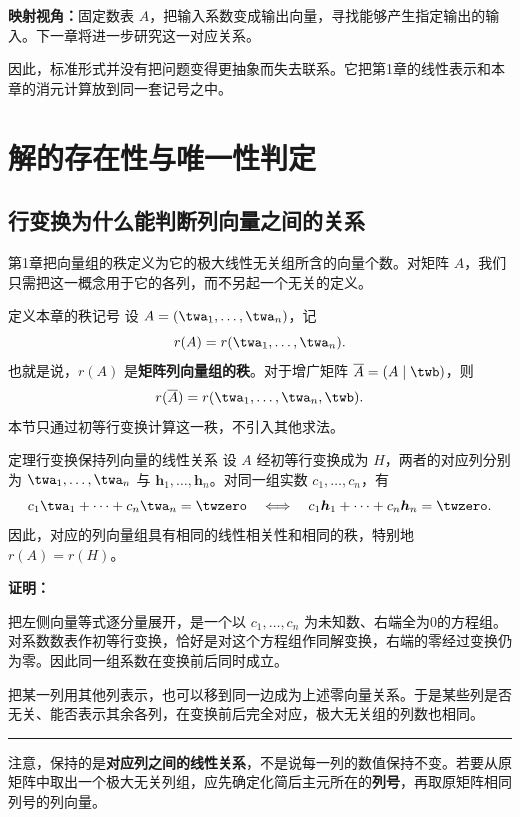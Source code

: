 \documentclass[a4paper,12pt,twoside,openany,fontset=none]{ctexbook}
\newcounter{theorem}[chapter]
\newenvironment{theorem}[1][]{\begin{thmBox}{定理}{#1}}{\end{thmBox}}
\newcounter{definition}[chapter]
\newenvironment{definition}[1][]{\begin{defBox}{定义}{#1}}{\end{defBox}}
\renewenvironment{proof}{
    \par\vspace{0.5em}\noindent
    \textbf{\color{LogicColor} 证明：}
}{
    \hfill \textcolor{LogicColor}{\rule{0.6em}{0.6em}} \par
}
\numberwithin{equation}{chapter}
\begin{document}
\textbf{映射视角：}固定数表 $A$，把输入系数变成输出向量，寻找能够产生指定输出的输入。下一章将进一步研究这一对应关系。

因此，标准形式并没有把问题变得更抽象而失去联系。它把第1章的线性表示和本章的消元计算放到同一套记号之中。

\section{解的存在性与唯一性判定}
\label{sec:two-existence-uniqueness}

\subsection*{行变换为什么能判断列向量之间的关系}

第1章把向量组的秩定义为它的极大线性无关组所含的向量个数。对矩阵 $A$，我们只需把这一概念用于它的各列，而不另起一个无关的定义。

\begin{definition}[本章的秩记号]
设 $A=(\twa_1,\ldots,\twa_n)$，记
\[
    r(A)=r(\twa_1,\ldots,\twa_n).
\]
也就是说，$r(A)$ 是\textbf{矩阵列向量组的秩}。对于增广矩阵 $\overline A=(A\mid\twb)$，则
\[
    r(\overline A)=r(\twa_1,\ldots,\twa_n,\twb).
\]
本节只通过初等行变换计算这一秩，不引入其他求法。
\end{definition}

\begin{theorem}[行变换保持列向量的线性关系]
设 $A$ 经初等行变换成为 $H$，两者的对应列分别为 $\twa_1,\ldots,\twa_n$ 与 $\boldsymbol h_1,\ldots,\boldsymbol h_n$。对同一组实数 $c_1,\ldots,c_n$，有
\[
    c_1\twa_1+\cdots+c_n\twa_n=\twzero
    \quad\Longleftrightarrow\quad
    c_1\boldsymbol h_1+\cdots+c_n\boldsymbol h_n=\twzero.
\]
因此，对应的列向量组具有相同的线性相关性和相同的秩，特别地 $r(A)=r(H)$。
\end{theorem}

\begin{proof}
把左侧向量等式逐分量展开，是一个以 $c_1,\ldots,c_n$ 为未知数、右端全为0的方程组。对系数数表作初等行变换，恰好是对这个方程组作同解变换，右端的零经过变换仍为零。因此同一组系数在变换前后同时成立。

把某一列用其他列表示，也可以移到同一边成为上述零向量关系。于是某些列是否无关、能否表示其余各列，在变换前后完全对应，极大无关组的列数也相同。
\end{proof}

注意，保持的是\textbf{对应列之间的线性关系}，不是说每一列的数值保持不变。若要从原矩阵中取出一个极大无关列组，应先确定化简后主元所在的\textbf{列号}，再取原矩阵相同列号的列向量。
\end{document}
